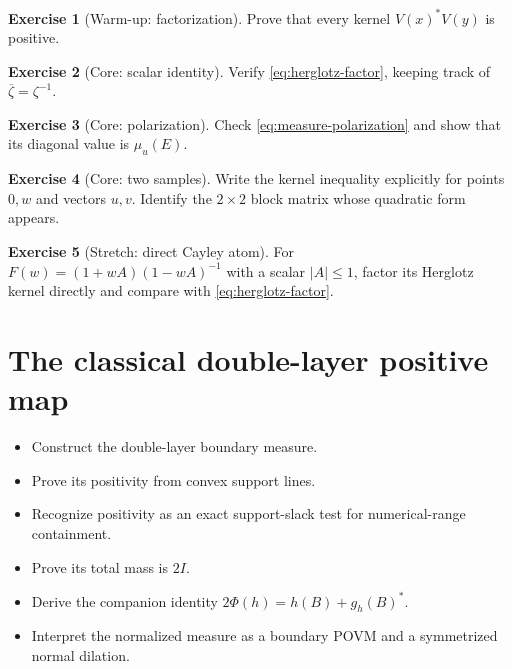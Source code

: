 \documentclass[11pt,oneside,openany]{book}
\theoremstyle{definition}
\newtheorem{exercise}{Exercise}[chapter]
\theoremstyle{remark}
\begin{document}
\begin{exercise}[Warm-up: factorization]
Prove that every kernel \(V(x)^*V(y)\) is positive.
\end{exercise}

\begin{exercise}[Core: scalar identity]
\label{ex:herglotz-factor}
Verify \eqref{eq:herglotz-factor}, keeping track of
\(\overline\zeta=\zeta^{-1}\).
\end{exercise}

\begin{exercise}[Core: polarization]
Check \eqref{eq:measure-polarization} and show that its diagonal value
is \(\mu_u(E)\).
\end{exercise}

\begin{exercise}[Core: two samples]
Write the kernel inequality explicitly for points \(0,w\) and vectors
\(u,v\).  Identify the \(2\times2\) block matrix whose quadratic form
appears.
\end{exercise}

\begin{exercise}[Stretch: direct Cayley atom]
For \(F(w)=(1+wA)(1-wA)^{-1}\) with a scalar \(|A|\leq1\), factor its
Herglotz kernel directly and compare with
\eqref{eq:herglotz-factor}.
\end{exercise}

\chapter{The classical double-layer positive map}
\label{ch:double-layer}

\begin{learninggoals}
\begin{itemize}
  \item Construct the double-layer boundary measure.
  \item Prove its positivity from convex support lines.
  \item Recognize positivity as an exact support-slack test for
  numerical-range containment.
  \item Prove its total mass is \(2I\).
  \item Derive the companion identity
  \(2\Phi(h)=h(B)+g_h(B)^*\).
  \item Interpret the normalized measure as a boundary POVM and a
  symmetrized normal dilation.
\end{itemize}
\end{learninggoals}
\end{document}
